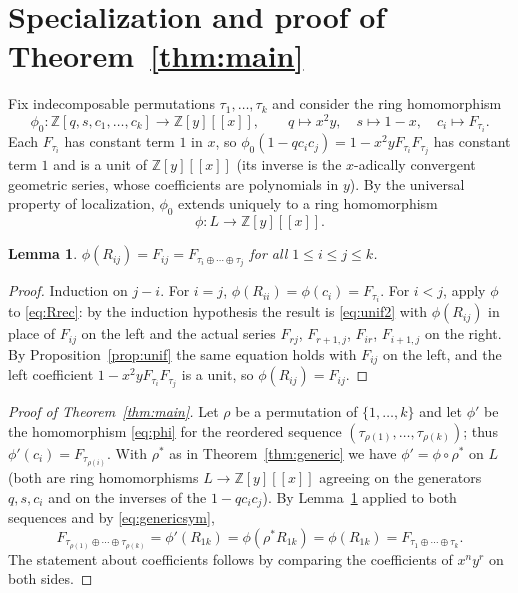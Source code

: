\documentclass[11pt]{amsart}
\newtheorem{lemma}[theorem]{Lemma}
\theoremstyle{definition}
\newcommand{\Z}{\mathbb{Z}}
\newcommand{\ds}{\oplus}
\begin{document}
\section{Specialization and proof of Theorem~\ref{thm:main}}\label{sec:special}

Fix indecomposable permutations $\tau_1,\dots,\tau_k$ and consider the ring homomorphism
\[
\phi_0:\Z[q,s,c_1,\dots,c_k]\longrightarrow\Z[y][[x]],\qquad q\mapsto x^2y,\quad s\mapsto1-x,\quad c_i\mapsto F_{\tau_i}.
\]
Each $F_{\tau_i}$ has constant term $1$ in $x$, so $\phi_0(1-qc_ic_j)=1-x^2yF_{\tau_i}F_{\tau_j}$ has constant term $1$ and is a unit of $\Z[y][[x]]$ (its inverse is the $x$-adically convergent geometric series, whose coefficients are polynomials in $y$). By the universal property of localization, $\phi_0$ extends uniquely to a ring homomorphism
\begin{equation}\label{eq:phi}
\phi:L\longrightarrow\Z[y][[x]].
\end{equation}

\begin{lemma}\label{lem:specialize}
$\phi(R_{ij})=F_{ij}=F_{\tau_i\ds\cdots\ds\tau_j}$ for all $1\le i\le j\le k$.
\end{lemma}

\begin{proof}
Induction on $j-i$. For $i=j$, $\phi(R_{ii})=\phi(c_i)=F_{\tau_i}$. For $i<j$, apply $\phi$ to \eqref{eq:Rrec}: by the induction hypothesis the result is \eqref{eq:unif2} with $\phi(R_{ij})$ in place of $F_{ij}$ on the left and the actual series $F_{rj}$, $F_{r+1,j}$, $F_{ir}$, $F_{i+1,j}$ on the right. By Proposition~\ref{prop:unif} the same equation holds with $F_{ij}$ on the left, and the left coefficient $1-x^2yF_{\tau_i}F_{\tau_j}$ is a unit, so $\phi(R_{ij})=F_{ij}$.
\end{proof}

\begin{proof}[Proof of Theorem~\ref{thm:main}]
Let $\rho$ be a permutation of $\{1,\dots,k\}$ and let $\phi'$ be the homomorphism \eqref{eq:phi} for the reordered sequence $(\tau_{\rho(1)},\dots,\tau_{\rho(k)})$; thus $\phi'(c_i)=F_{\tau_{\rho(i)}}$. With $\rho^*$ as in Theorem~\ref{thm:generic} we have $\phi'=\phi\circ\rho^*$ on $L$ (both are ring homomorphisms $L\to\Z[y][[x]]$ agreeing on the generators $q,s,c_i$ and on the inverses of the $1-qc_ic_j$). By Lemma~\ref{lem:specialize} applied to both sequences and by \eqref{eq:genericsym},
\[
F_{\tau_{\rho(1)}\ds\cdots\ds\tau_{\rho(k)}}=\phi'(R_{1k})=\phi(\rho^*R_{1k})=\phi(R_{1k})=F_{\tau_1\ds\cdots\ds\tau_k}.
\]
The statement about coefficients follows by comparing the coefficients of $x^ny^r$ on both sides.
\end{proof}
\end{document}

